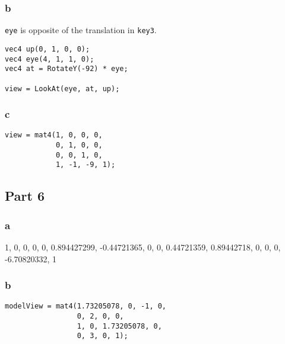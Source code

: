 \subsubsection{b}
\texttt{eye} is opposite of the translation in \texttt{key3}.
\begin{lstlisting}
vec4 up(0, 1, 0, 0);
vec4 eye(4, 1, 1, 0);
vec4 at = RotateY(-92) * eye;

view = LookAt(eye, at, up);
\end{lstlisting}

\subsubsection{c}

\begin{lstlisting}
view = mat4(1, 0, 0, 0,
			0, 1, 0, 0,
			0, 0, 1, 0,
			1, -1, -9, 1);
\end{lstlisting}


\subsection{Part 6}

\subsubsection{a}

1, 0, 0, 0,
0, 0.894427299, -0.44721365, 0,
0, 0.44721359, 0.89442718, 0,
0, 0, -6.70820332, 1

\subsubsection{b}
\begin{lstlisting}
modelView = mat4(1.73205078, 0, -1, 0,
			     0, 2, 0, 0,
				 1, 0, 1.73205078, 0,
				 0, 3, 0, 1);
\end{lstlisting}

